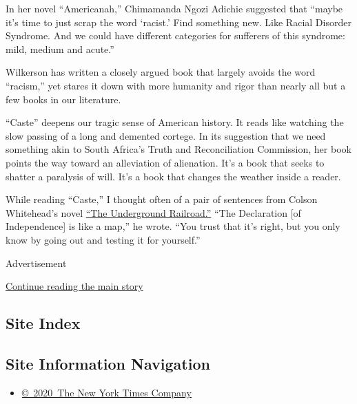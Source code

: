 In her novel ``Americanah,'' Chimamanda Ngozi Adichie suggested that
``maybe it's time to just scrap the word `racist.' Find something new.
Like Racial Disorder Syndrome. And we could have different categories
for sufferers of this syndrome: mild, medium and acute.''

Wilkerson has written a closely argued book that largely avoids the word
``racism,'' yet stares it down with more humanity and rigor than nearly
all but a few books in our literature.

``Caste'' deepens our tragic sense of American history. It reads like
watching the slow passing of a long and demented cortege. In its
suggestion that we need something akin to South Africa's Truth and
Reconciliation Commission, her book points the way toward an alleviation
of alienation. It's a book that seeks to shatter a paralysis of will.
It's a book that changes the weather inside a reader.

While reading ``Caste,'' I thought often of a pair of sentences from
Colson Whitehead's novel
\href{https://www.nytimes3xbfgragh.onion/2016/08/03/books/review-the-underground-railroad-colson-whitehead.html}{``The
Underground Railroad.''} ``The Declaration {[}of Independence{]} is like
a map,'' he wrote. ``You trust that it's right, but you only know by
going out and testing it for yourself.''

Advertisement

\protect\hyperlink{after-bottom}{Continue reading the main story}

\hypertarget{site-index}{%
\subsection{Site Index}\label{site-index}}

\hypertarget{site-information-navigation}{%
\subsection{Site Information
Navigation}\label{site-information-navigation}}

\begin{itemize}
\tightlist
\item
  \href{https://help.nytimes3xbfgragh.onion/hc/en-us/articles/115014792127-Copyright-notice}{©~2020~The
  New York Times Company}
\end{itemize}

